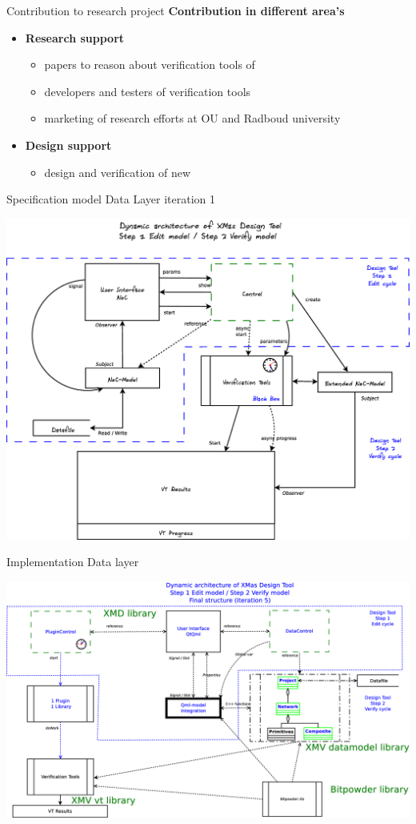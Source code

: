 \documentclass[11pt]{beamer}
\begin{document}
\begin{frame}{Contribution to research project}
	\textbf{Contribution in different area's}
	\begin{itemize}
		\item {\bf Research support}
		\begin{itemize}
			\item papers to reason about verification tools of \Noc
			\item developers and testers of verification tools
			\item marketing of research efforts at OU and Radboud university
		\end{itemize}
		\item {\bf Design support}
		\begin{itemize}
			\item design and verification of new \Noc
		\end{itemize}
	\end{itemize}

\end{frame}



\begin{frame}{Specification model Data Layer iteration 1}

	\includegraphics[width=.80\linewidth]{pictures/1c-architecture-dynamic-1}

\end{frame}

\begin{frame}{Implementation Data layer}

	\includegraphics[width=.90\linewidth]{pictures/1c-architecture-dynamic-2}

\end{frame}
\end{document}
